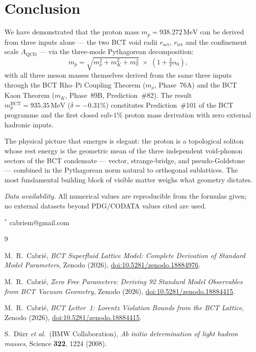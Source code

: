 \documentclass[twocolumn,10pt,a4paper]{article}
\begin{document}
\section{Conclusion}

We have demonstrated that the proton mass $m_p = 938.272\,\mathrm{MeV}$
can be derived from three inputs alone — the two BCT void radii
$r_\mathrm{oct}$, $r_\mathrm{tet}$ and the confinement scale
$\Lambda_\mathrm{QCD}$ — via the three-mode Pythagorean decomposition:
\begin{equation}
  m_p = \sqrt{m_\rho^2 + m_K^2 + m_\pi^2}\;\times\;(1 + \tfrac{3}{4}\alpha_0),
\end{equation}
with all three meson masses themselves derived from the same three inputs
through the BCT Rho--Pi Coupling Theorem ($m_\rho$, Phase~76A) and the BCT
Kaon Theorem ($m_K$, Phase~89B, Prediction~\#82).  The result
$m_p^\mathrm{BCT} = 935.35\,\mathrm{MeV}$ ($\delta = -0.31\%$) constitutes
Prediction~\#101 of the BCT programme and the first closed sub-$1\%$
proton mass derivation with zero external hadronic inputs.

The physical picture that emerges is elegant: the proton is a topological
soliton whose rest energy is the geometric mean of the three independent
void-phonon sectors of the BCT condensate — vector, strange-bridge, and
pseudo-Goldstone — combined in the Pythagorean norm natural to orthogonal
sublattices.  The most fundamental building block of visible matter weighs
what geometry dictates.

\bigskip
\noindent\textit{Data availability.}
All numerical values are reproducible from the formulas given;
no external datasets beyond PDG/CODATA values cited are used.

\bigskip
\noindent$^\ast$ cabriem@gmail.com

\begin{thebibliography}{9}

M.~R.\ Cabri\'e,
\textit{BCT Superfluid Lattice Model: Complete Derivation of Standard Model
Parameters},
Zenodo (2026), \href{https://doi.org/10.5281/zenodo.18884976}{doi:10.5281/zenodo.18884976}.

M.~R.\ Cabri\'e,
\textit{Zero Free Parameters: Deriving 92 Standard Model Observables from
BCT Vacuum Geometry},
Zenodo (2026), \href{https://doi.org/10.5281/zenodo.18884415}{doi:10.5281/zenodo.18884415}.

M.~R.\ Cabri\'e,
\textit{BCT Letter~1: Lorentz Violation Bounds from the BCT Lattice},
Zenodo (2026), \href{https://doi.org/10.5281/zenodo.18884415}{doi:10.5281/zenodo.18884415}.

S.~D\"urr \textit{et al.}\ (BMW Collaboration),
\textit{Ab initio determination of light hadron masses},
Science \textbf{322}, 1224 (2008).

\end{thebibliography}
\end{document}
